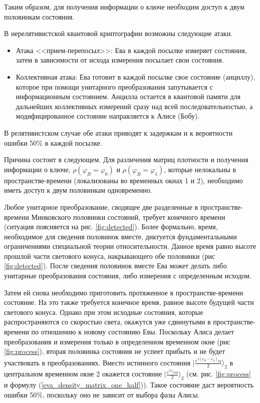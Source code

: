 Таким образом, для получения информации о ключе необходим доступ к двум половинкам состояния.

В нерелятивистской квантовой криптографии возможны следующие атаки.
\begin{itemize}
  \item Атака <<прием-перепосыл>>: Ева в каждой посылке измеряет состояния, затем в зависимости от исхода измерения посылает свои состояния.
  \item Коллективная атака: Ева готовит в каждой посылке свое состояние (анциллу), которое при помощи унитарного преобразования запутывается с информационным состоянием.
  Анцилла остается в квантовой памяти для дальнейших коллективных измерений сразу над всей последовательностью, а модифицированное состояние направляется к Алисе (Бобу).
\end{itemize}

В релятивистском случае обе атаки приводят к задержкам и к вероятности ошибки 50\% в каждой посылке.

Причина состоит в следующем. Для различения матриц плотности и получения информации о ключе, $\rho(\varphi_B = \varphi_0)$ и $\rho(\varphi_B = \varphi_1)$, которые нелокальны в пространстве-времени (локализованы во временных окнах 1 и 2), необходимо иметь доступ к двум половинкам одновременно.

Любое унитарное преобразование, сводящее две разделенные в пространстве-времени Минковского половинки состояний, требует конечного времени (ситуация поясняется на рис. \ref{fig:detected}). 
Более формально, время, необходимое для сведения половинок вместе, диктуется фундаментальными ограничениями специальной теории относительности.
Данное время равно высоте прошлой части светового конуса, накрывающего обе половинки (рис \ref{fig:detected}). 
После сведения половинок вместе Ева может делать либо унитарные преобразования состояния, либо измерения с определенным исходом.

Затем ей снова необходимо приготовить протяженное в пространстве-времени состояние. На это также требуется конечное время, равное высоте будущей части светового конуса. 
Однако при этом исходные состояния, которые распространяются со скоростью света, окажутся уже сдвинутыми в пространстве-времени по отношению к новому состоянию Евы.
Поскольку Алиса делает преобразования и измерения только в определенном временном окне (рис \ref{fig:process}), вторая половинка состояния не успеет прибыть и не будет участвовать в преобразованиях. Вместо истинного состояния $| \frac{e^{i(\varphi_B - \varphi_A)}\alpha}{2}\rangle_2$ в центральном временном окне 2 окажется состояние $| \frac{e^{i\varphi_B}\alpha}{2} \rangle_2$ (см. рис. \ref{fig:process} и формулу (\ref{eva_density_matrix_one_half})). 
Такое состояние даст вероятность ошибки 50\%, поскольку оно не зависит от выбора фазы Алисы.

